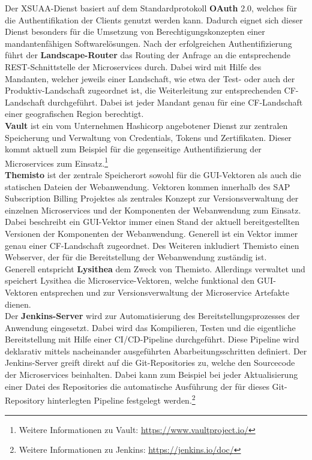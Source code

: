 Der \ac{XSUAA}-Dienst basiert auf dem Standardprotokoll \textbf{OAuth} 2.0, welches für die Authentifikation der Clients genutzt werden kann. Dadurch eignet sich dieser Dienst besonders für die Umsetzung von Berechtigungskonzepten einer mandantenfähigen Softwarelösungen.\autocite[Vgl.][]{SAPSEodereinSAPKonzernunternehmen.2020}%
Nach der erfolgreichen Authentifizierung führt der \textbf{Landscape-Router} das Routing der Anfrage an die entsprechende \ac{REST}-Schnittstelle der Microservices durch. Dabei wird mit Hilfe des Mandanten, welcher jeweils einer Landschaft, wie etwa der Test- oder auch der Produktiv-Landschaft zugeordnet ist, die Weiterleitung zur entsprechenden \ac{CF}-Landschaft durchgeführt. Dabei ist jeder Mandant genau für eine \ac{CF}-Landschaft einer geografischen Region berechtigt.\\
\textbf{Vault} ist ein vom Unternehmen Hashicorp angebotener Dienst zur zentralen Speicherung und Verwaltung von Credentials, Tokens und Zertifikaten. Dieser kommt aktuell zum Beispiel für die gegenseitige Authentifizierung der Microservices zum Einsatz.\footnote{Weitere Informationen zu Vault: \url{https://www.vaultproject.io/}}\\
\textbf{Themisto} ist der zentrale Speicherort sowohl für die \ac{GUI}-Vektoren als auch die statischen Dateien der Webanwendung. Vektoren kommen innerhalb des SAP Subscription Billing Projektes als zentrales Konzept zur Versionsverwaltung der einzelnen Microservices und der Komponenten der Webanwendung zum Einsatz. Dabei beschreibt ein \ac{GUI}-Vektor immer einen Stand der aktuell bereitgestellten Versionen der Komponenten der Webanwendung. Generell ist ein Vektor immer genau einer \ac{CF}-Landschaft zugeordnet. Des Weiteren inkludiert Themisto einen Webserver, der für die Bereitstellung der Webanwendung zuständig ist.\\
Generell entspricht \textbf{Lysithea} dem Zweck von Themisto. Allerdings verwaltet und speichert Lysithea die Microservice-Vektoren, welche funktional den \ac{GUI}-Vektoren entsprechen und zur Versionsverwaltung der Microservice Artefakte dienen.\\  
Der \textbf{Jenkins-Server} wird zur Automatisierung des Bereitstellungsprozesses der Anwendung eingesetzt. Dabei wird das Kompilieren, Testen und die eigentliche Bereitstellung mit Hilfe einer \ac{CI}/\ac{CD}-Pipeline durchgeführt. Diese Pipeline wird deklarativ mittels nacheinander ausgeführten Abarbeitungsschritten definiert. Der Jenkins-Server greift direkt auf die Git-Repositories zu, welche den Sourcecode der Microservices beinhalten. Dabei kann zum Beispiel bei jeder Aktualisierung einer Datei des Repositories die automatische Ausführung der für dieses Git-Repository hinterlegten Pipeline festgelegt werden.\footnote{Weitere Informationen zu Jenkins: \url{https://jenkins.io/doc/}}\\ 
